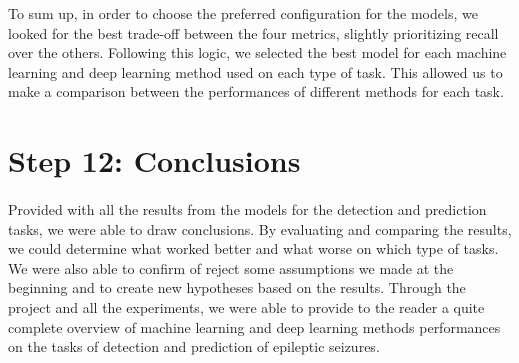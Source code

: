 To sum up, in order to choose the preferred configuration for the models, we looked for the best trade-off between the four metrics, slightly prioritizing recall over the others. Following this logic, we selected the best model for each machine learning and deep learning method used on each type of task. This allowed us to make a comparison between the performances of different methods for each task.


\section{Step 12: Conclusions} \label{sec: step_conclusions}
\paragraph{} Provided with all the results from the models for the detection and prediction tasks, we were able to draw conclusions. By evaluating and comparing the results, we could determine what worked better and what worse on which type of tasks. We were also able to confirm of reject some assumptions we made at the beginning and to create new hypotheses based on the results. Through the project and all the experiments, we were able to provide to the reader a quite complete overview of machine learning and deep learning methods performances on the tasks of detection and prediction of epileptic seizures.
